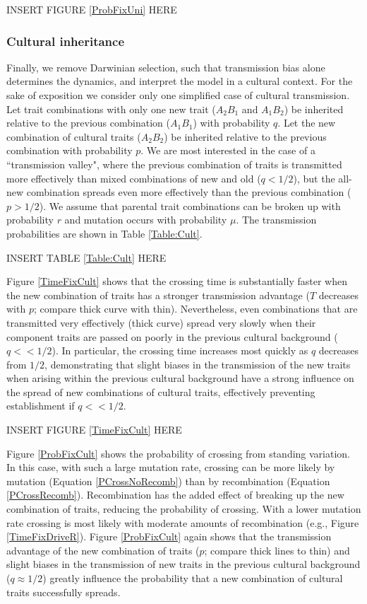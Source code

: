 \documentclass[review,3p,authoryear]{elsarticle}
\begin{document}
INSERT FIGURE \ref{ProbFixUni} HERE

\subsubsection{Cultural inheritance}

Finally, we remove Darwinian selection, such that transmission bias alone determines the dynamics, and interpret the model in a cultural context.
For the sake of exposition we consider only one simplified case of cultural transmission.
Let trait combinations with only one new trait ($A_2B_1$ and $A_1B_2$) be inherited relative to the previous combination ($A_1B_1$) with probability $q$.
Let the new combination of cultural traits ($A_2B_2$) be inherited relative to the previous combination with probability $p$.
We are most interested in the case 
of a ``transmission valley", where the previous combination of traits is transmitted more effectively than mixed combinations of new and old ($q<1/2$), but the all-new combination spreads even more effectively than the previous combination ($p>1/2$).
We assume that parental trait combinations can be broken up with probability $r$  and mutation occurs with probability $\mu$.
The transmission probabilities are shown in Table \ref{Table:Cult}.

INSERT TABLE \ref{Table:Cult} HERE

Figure \ref{TimeFixCult} shows that the crossing time is substantially faster when the new combination of traits has a stronger transmission advantage ($T$ decreases with $p$; compare thick curve with thin).  
Nevertheless, even combinations that are transmitted very effectively (thick curve) spread very slowly when their component traits are passed on poorly in the previous cultural background ($q<<1/2$).
In particular, the crossing time increases most quickly as $q$ decreases from $1/2$, demonstrating that slight biases in the transmission of the new traits when arising within the previous cultural background have a strong influence on the spread of new combinations of cultural traits, effectively preventing establishment if $q<<1/2$.

INSERT FIGURE \ref{TimeFixCult} HERE

Figure \ref{ProbFixCult} shows the probability of crossing from standing variation.
In this case, with such a large mutation rate, crossing can be more likely by mutation (Equation \ref{PCrossNoRecomb}) than by recombination (Equation \ref{PCrossRecomb}).
Recombination has the added effect of breaking up the new combination of traits, reducing the probability of crossing.
With a lower mutation rate crossing is most likely with moderate amounts of recombination (e.g., Figure \ref{TimeFixDriveR}). 
Figure \ref{ProbFixCult} again shows that the transmission advantage of the new combination of traits ($p$; compare thick lines to thin) and slight biases in the transmission of new traits in the previous cultural background ($q\approx1/2$) greatly influence the probability that a new combination of cultural traits successfully spreads.
 
\end{document}
